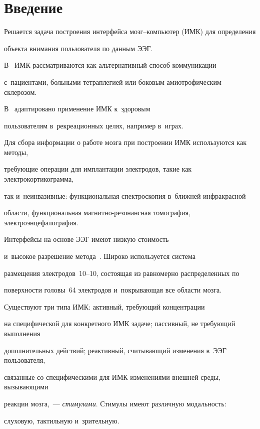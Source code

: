 \section{Введение}



Решается задача построения интерфейса мозг--компь\-ютер (ИМК) для определения 

объекта внимания пользователя по данным ЭЭГ. 

В~\cite{ALS_cite} ИМК рас\-смат\-ри\-ва\-ют\-ся как альтернативный способ коммуникации 

с~пациентами, больными тетраплегией или боковым амиотрофическим склерозом. 

В~\cite{Kaplan_Shishkin_games} адаптировано применение ИМК к~здоровым 

пользователям в~рекреационных целях, например в~играх.



Для сбора информации о работе мозга при построении ИМК используются как методы, 

требующие операции для имплантации электродов, такие как электрокортикограмма, 

так и~неинвазивные:  функциональная спектроскопия в~ближней инфракрасной 

области, функциональная маг\-нит\-но-ре\-зо\-нанс\-ная томография, электроэнцефалография.



Интерфейсы на основе ЭЭГ имеют низкую стоимость 

и~высокое разрешение метода~\cite{eeg_review}. Широко используется сис\-те\-ма 

размещения электродов~10--10, состоящая из равномерно распределенных по 

поверхности головы~64 электродов и~покрывающая все области мозга.

Существуют три типа ИМК: активный, требующий концентрации 

на специфической для конкретного ИМК задаче; пассивный, не требующий выполнения 

дополнительных действий; реактивный, считывающий изменения в~ЭЭГ пользователя, 

связанные со специфическими для ИМК изменениями внешней среды, вызывающими 

реакции мозга,~--- \emph{стимулами}. Стимулы имеют различную модальность:  

слуховую, тактильную и~зрительную.



